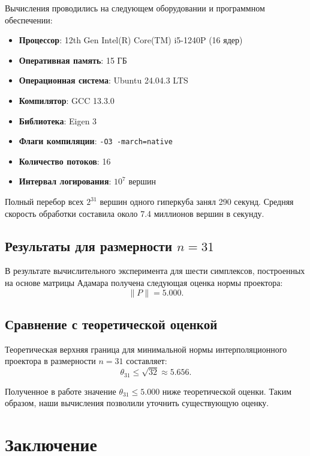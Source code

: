 \documentclass[a4paper,12pt]{article}
\theoremstyle{indented}
\begin{document}
Вычисления проводились на следующем оборудовании и программном обеспечении:

\begin{itemize}
    \item \textbf{Процессор}: 12th Gen Intel(R) Core(TM) i5-1240P (16 ядер)
    \item \textbf{Оперативная память}: 15 ГБ
    \item \textbf{Операционная система}: Ubuntu 24.04.3 LTS
    \item \textbf{Компилятор}: GCC 13.3.0
    \item \textbf{Библиотека}: Eigen 3
    \item \textbf{Флаги компиляции}: \texttt{-O3 -march=native}
    \item \textbf{Количество потоков}: 16
    \item \textbf{Интервал логирования}: $10^7$ вершин
\end{itemize}

Полный перебор всех $2^{31}$ вершин одного гиперкуба занял 290 секунд. Средняя скорость обработки составила около 7.4 миллионов вершин в секунду.

\subsection{Результаты для размерности $n = 31$}

В результате вычислительного эксперимента для шести симплексов, построенных на основе матрицы Адамара получена следующая оценка нормы проектора:
\[
\|P\| = 5.000.
\]

\subsection{Сравнение с теоретической оценкой}

Теоретическая верхняя граница для минимальной нормы интерполяционного проектора в размерности $n = 31$ составляет:
\[
\theta_{31} \le \sqrt{32} \approx 5.656.
\]

Полученное в работе значение $\theta_{31} \le 5.000$ ниже теоретической оценки. Таким образом, наши вычисления позволили уточнить существующую оценку.

\newpage

\section*{Заключение}
\end{document}
